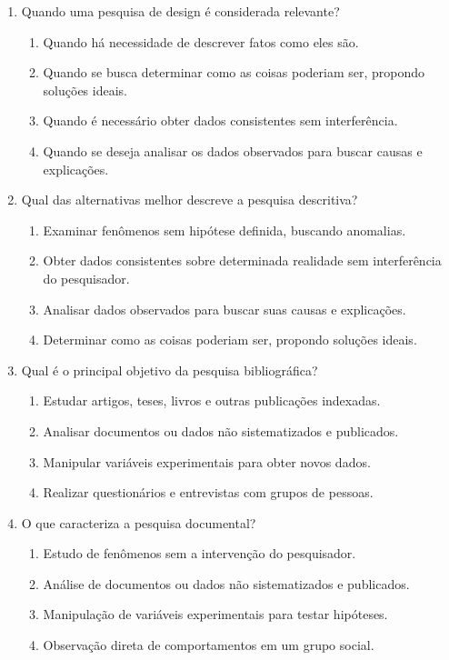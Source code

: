 \documentclass[a4paper,12pt]{article}
\begin{document}
\begin{enumerate}
\item Quando uma pesquisa de design é considerada relevante?
    \begin{enumerate}[label=(\alph*)]
        \item Quando há necessidade de descrever fatos como eles são.
        \item Quando se busca determinar como as coisas poderiam ser, propondo soluções ideais.
        \item Quando é necessário obter dados consistentes sem interferência.
        \item Quando se deseja analisar os dados observados para buscar causas e explicações.
    \end{enumerate}

\item Qual das alternativas melhor descreve a pesquisa descritiva?
    \begin{enumerate}[label=(\alph*)]
        \item Examinar fenômenos sem hipótese definida, buscando anomalias.
        \item Obter dados consistentes sobre determinada realidade sem interferência do pesquisador.
        \item Analisar dados observados para buscar suas causas e explicações.
        \item Determinar como as coisas poderiam ser, propondo soluções ideais.
    \end{enumerate}

    \item Qual é o principal objetivo da pesquisa bibliográfica?
    \begin{enumerate}[label=(\alph*)]
        \item Estudar artigos, teses, livros e outras publicações indexadas.
        \item Analisar documentos ou dados não sistematizados e publicados.
        \item Manipular variáveis experimentais para obter novos dados.
        \item Realizar questionários e entrevistas com grupos de pessoas.
    \end{enumerate}

\item O que caracteriza a pesquisa documental?
    \begin{enumerate}[label=(\alph*)]
        \item Estudo de fenômenos sem a intervenção do pesquisador.
        \item Análise de documentos ou dados não sistematizados e publicados.
        \item Manipulação de variáveis experimentais para testar hipóteses.
        \item Observação direta de comportamentos em um grupo social.
    \end{enumerate}


\end{enumerate}
\end{document}
